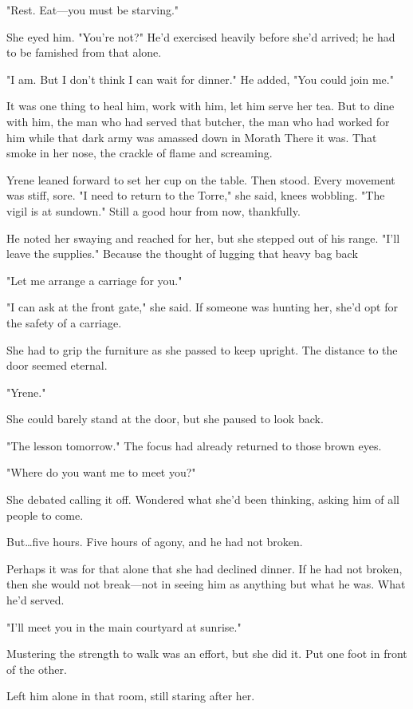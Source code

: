 "Rest.
Eat---you must be starving."

She eyed him.
"You're not?"
He'd exercised heavily before she'd arrived; he had to be famished from that alone.

"I am.
But I don't think I can wait for dinner."
He added, "You could join me."

It was one thing to heal him, work with him, let him serve her tea.
But to dine with him, the man who had served that butcher, the man who had worked for him while that dark army was amassed down in Morath 
There it was.
That smoke in her nose, the crackle of flame and screaming.

Yrene leaned forward to set her cup on the table.
Then stood.
Every movement was stiff, sore.
"I need to return to the Torre," she said, knees wobbling.
"The vigil is at sundown."
Still a good hour from now, thankfully.

He noted her swaying and reached for her, but she stepped out of his range.
"I'll leave the supplies."
Because the thought of lugging that heavy bag back 

"Let me arrange a carriage for you."

"I can ask at the front gate," she said.
If someone was hunting her, she'd opt for the safety of a carriage.

She had to grip the furniture as she passed to keep upright.
The distance to the door seemed eternal.

"Yrene."

She could barely stand at the door, but she paused to look back.

"The lesson tomorrow."
The focus had already returned to those brown eyes.

"Where do you want me to meet you?"

She debated calling it off.
Wondered what she'd been thinking, asking him of all people to come.

But\ldots five hours.
Five hours of agony, and he had not broken.

Perhaps it was for that alone that she had declined dinner.
If he had not broken, then she would not break---not in seeing him as anything but what he was.
What he'd served.

"I'll meet you in the main courtyard at sunrise."

Mustering the strength to walk was an effort, but she did it.
Put one foot in front of the other.

Left him alone in that room, still staring after her.

